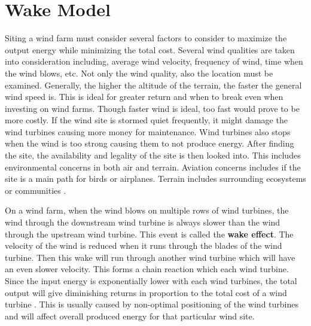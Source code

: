 \section{Wake Model}
    Siting a wind farm must consider several factors to consider to maximize the output energy while minimizing the total cost. Several wind qualities are taken into consideration including, average wind velocity, frequency of wind, time when the wind blows, etc. Not only the wind quality, also the location must be examined. Generally, the higher the altitude of the terrain, the faster the general wind speed is. This is ideal for greater return and when to break even when investing on wind farms. Though faster wind is ideal, too fast would prove to be more costly. If the wind site is stormed quiet frequently, it might damage the wind turbines causing more money for maintenance. Wind turbines also stops when the wind is too strong causing them to not produce energy. After finding the site, the availability and legality of the site is then looked into. This includes environmental concerns in both air and terrain. Aviation concerns includes if the site is a main path for birds or airplanes. Terrain includes surrounding ecosystems or communities \cite{book1}.
    
    On a wind farm, when the wind blows on multiple rows of wind turbines, the wind through the downstream wind turbine is always slower than the wind through the upstream wind turbine. This event is called the \textbf{wake effect}. The velocity of the wind is reduced when it runs through the blades of the wind turbine. Then this wake will run through another wind turbine which will have an even slower velocity. This forms a chain reaction which each wind turbine. Since the input energy is exponentially lower with each wind turbines, the total output will give diminishing returns in proportion to the total cost of a wind turbine \cite{wakelosses}. This is usually caused by non-optimal positioning of the wind turbines and will affect overall produced energy for that particular wind site.

